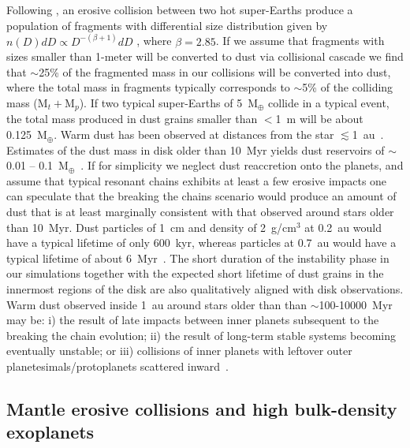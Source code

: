 \documentclass[fleqn,usenatbib]{mnras}
\begin{document}
Following \cite{leinhardt2012}, an erosive collision between two hot super-Earths produce a population of fragments with differential size distribution given by $n(D)dD \propto D^{-(\beta +1)}dD$ , where $\beta = 2.85$. If we assume that fragments with sizes smaller than 1-meter will be converted to dust via collisional cascade we find that $\sim$25\% of the fragmented mass in our collisions will be converted into dust, where the total mass in fragments typically corresponds to $\sim$5\% of the colliding mass (M$_t+$M$_p$). If two typical super-Earths of 5~M$_{\oplus}$ collide in a typical event, the total mass produced in dust grains smaller than $<$1~m will be about 0.125~M$_{\oplus}$. Warm dust has been observed at distances from the star $\lesssim$1~au~\citep[e.g.][]{kennedywyatt12,thompsonetal19}. Estimates of the dust mass in disk older than 10~Myr yields dust reservoirs of $\sim$0.01 – 0.1~M$_{\oplus}$~\citep{wyatt08}. If for simplicity we neglect dust reaccretion onto the planets, and assume that typical resonant chains exhibits at least a few erosive impacts one can speculate that the breaking the chains scenario would produce an amount of dust that is at least marginally consistent with that observed around stars older than 10~Myr. Dust particles of 1~cm and density of 2~g/cm$^3$ at 0.2~au would have a typical lifetime of only 600~kyr, whereas particles at 0.7~au would have a typical lifetime of about 6~Myr~\citep{wyattwhipple1950}. The short duration of the instability phase in our simulations together with the expected short lifetime of dust grains in the innermost regions of the disk are also qualitatively aligned with disk observations. Warm dust observed inside 1~au around stars  older than than $\sim$100-10000~Myr~\citep[e.g.][]{thompsonetal19} may be: i) the result of late impacts between inner planets subsequent to the breaking the chain evolution; ii) the result of long-term stable systems  becoming eventually unstable; or iii) collisions of inner planets with leftover outer planetesimals/protoplanets scattered inward~\cite[e.g.][]{wyatt08}.

\subsection{Mantle erosive collisions and high bulk-density exoplanets}
\end{document}

